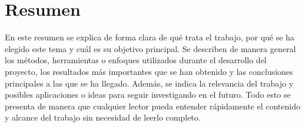 
\chapter*{Resumen}

En este resumen se explica de forma clara de qué trata el trabajo, por qué se ha elegido este tema y cuál es su objetivo principal. Se describen de manera general los métodos, herramientas o enfoques utilizados durante el desarrollo del proyecto, los resultados más importantes que se han obtenido y las conclusiones principales a las que se ha llegado. Además, se indica la relevancia del trabajo y posibles aplicaciones o ideas para seguir investigando en el futuro. Todo esto se presenta de manera que cualquier lector pueda entender rápidamente el contenido y alcance del trabajo sin necesidad de leerlo completo.